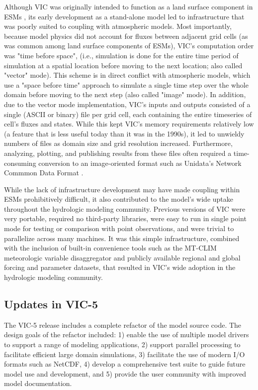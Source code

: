 \documentclass[gmd, manuscript]{copernicus}
\begin{document}
  Although VIC was originally intended to function as a land surface component in ESMs \citep{Liang_1994}, its early development as a stand-alone model led to infrastructure that was poorly suited to coupling with atmospheric models.  Most importantly, because model physics did not account for fluxes between adjacent grid cells (as was common among land surface components of ESMs), VIC's computation order was "time before space", (i.e., simulation is done for the entire time period of simulation at a spatial location before moving to the next location; also called "vector" mode).  This scheme is in direct conflict with atmospheric models, which use a "space before time" approach to simulate a single time step over the whole domain before moving to the next step (also called "image" mode). In addition, due to the vector mode implementation, VIC's inputs and outputs consisted of a single (ASCII or binary) file per grid cell, each containing the entire timeseries of cell's fluxes and states. While this kept VIC's memory requirements relatively low (a feature that is less useful today than it was in the 1990s), it led to unwieldy numbers of files as domain size and grid resolution increased. Furthermore, analyzing, plotting, and publishing results from these files often required a time-consuming conversion to an image-oriented format such as Unidata's Network Commmon Data Format \citep[NetCDF; ][]{Rew_1990}.

  While the lack of infrastructure development may have made coupling within ESMs prohibitively difficult, it also contributed to the model's wide uptake throughout the hydrologic modeling community. Previous versions of VIC were very portable, required no third-party libraries, were easy to run in single point mode for testing or comparison with point observations, and were trivial to parallelize across many machines. It was this simple infrastructure, combined with the inclusion of built-in convenience tools such as the MT-CLIM \citep{Thornton_1999,Bohn_2013} meteorologic variable disaggregator and publicly available regional and global forcing and parameter datasets, that resulted in VIC's wide adoption in the hydrologic modeling community.

  \subsection{Updates in VIC-5}
    \label{sec:vic-5}
    The VIC-5 release includes a complete refactor of the model source code. The design goals of the refactor included: 1) enable the use of multiple model drivers to support a range of modeling applications, 2) support parallel processing to facilitate efficient large domain simulations, 3) facilitate the use of modern I/O formats such as NetCDF, 4) develop a comprehensive test suite to guide future model use and development, and 5) provide the user community with improved model documentation.
\end{document}
